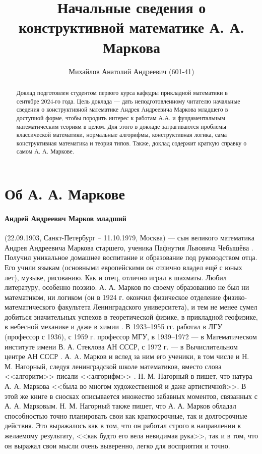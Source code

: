 \documentclass[a4paper,12pt,russian]{article}
\title{Начальные сведения о конструктивной математике А. А. Маркова}
\author{Михайлов Анатолий Андреевич (601-41)}
\begin{document}
\maketitle

\begin{abstract}
Доклад подготовлен студентом первого курса кафедры прикладной математики в сентябре 2024-го года. Цель доклада --- дать неподготовленному читателю начальные сведения о конструктивной математике Андрея Андреевича Маркова младшего в доступной форме, чтобы породить интерес к работам А.А. и фундаментальным математическим теориям в целом. Для этого в докладе затрагиваются проблемы классической математики, нормальные алгорифмы, конструктивная логика, сама конструктивная математика и теория типов. Также, доклад содержит краткую справку о самом А. А. Маркове.
\end{abstract}

\section{Об А. А. Маркове}
\paragraph{Андрей Андреевич Марков младший} (22.09.1903, Санкт-Петербург -- 11.10.1979, Москва) --- сын великого математика Андрея Андреевича Маркова старшего, ученика Пафнутия Львовича Чебышёва \cite{bre}. Получил уникальное домашнее воспитание и образование под руководством отца. Его учили языкам (основными европейскими он отлично владел ещё с юных лет), музыке, рисованию. Как и отец, отлично играл в шахматы. Любил литературу, особенно поэзию. \cite[Том 1, От составителя, пункт 3]{markov} А. А. Марков по своему образованию не был ни математиком, ни логиком (он в 1924 г. окончил физическое отделение физико-математического факультета Ленинградского университета), и тем не менее сумел добиться значительных успехов в теоретической физике, в прикладной геофизике, в небесной механике и даже в химии \cite{nagorny_markov}. В 1933–1955 гг. работал в ЛГУ (профессор с 1936), с 1959 г. профессор МГУ, в 1939–1972 --- в Математическом институте имени В. А. Стеклова АН СССР, с 1972 г. --- в Вычислительном центре АН СССР \cite{bre}. А. A. Марков и вслед за ним его ученики, в том числе и Н. М. Нагорный, следуя ленинградской школе математиков, вместо слова <<алгоритм>> писали <<алгорифм>> \cite{nagorny_markov}. Н. М. Нагорный в \cite[Том 1, От составителя, пункт 1.1]{markov} пишет, что натура А. А. Маркова <<была во многом художественной и даже артистичной>>. В этой же книге в сносках описывается множество забавных моментов, связанных с А. А. Марковым. Н. М. Нагорный также пишет, что А. А. Марков обладал способностью точно планировать свои как краткосрочные, так и долгосрочные действия. Это выражалось как в том, что он работал строго в направлении к желаемому результату, <<как будто его вела невидимая рука>>, так и в том, что он выражал свои мысли очень выверенно, легко для восприятия и точно.
\end{document}
